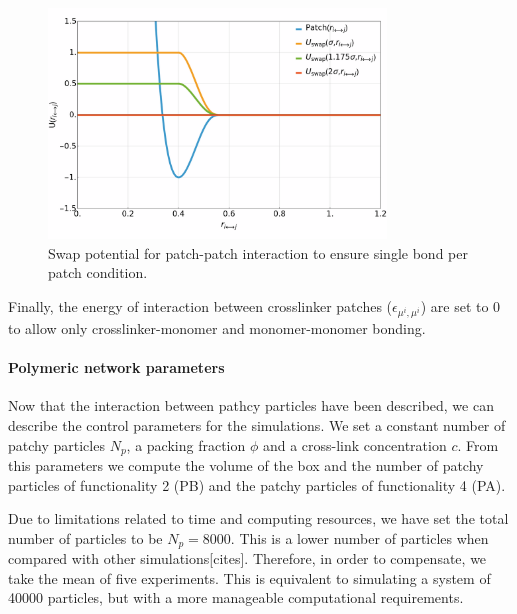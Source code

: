 \begin{figure}[ht!]
    \centering
    \includegraphics[width=0.8\textwidth]{figs/numerical/swapPotential.png}
    \caption{Swap potential for patch-patch interaction to ensure single bond per patch condition.}\label{fig:swappot}
\end{figure}



Finally, the energy of interaction between crosslinker patches ($\epsilon_{\mu^i,\mu^i}$) are set to $0$ to allow only crosslinker-monomer and monomer-monomer bonding.

\paragraph{Polymeric network parameters}
Now that the interaction between pathcy particles have been described, we can describe the control parameters for the simulations.
We set a constant number of patchy particles $N_p$, a packing fraction $\phi$ and a cross-link concentration $c$. 
From this parameters we compute the volume of the box and the number of patchy particles of functionality 2 (PB) and the patchy particles of functionality 4 (PA).

Due to limitations related to time and computing resources, we have set the total number of particles to be $N_p=\num{8000}$.
This is a lower number of particles when compared with other simulations[cites].
Therefore, in order to compensate, we take the mean of five experiments.
This is equivalent to simulating a system of \num{40000} particles, but with a more manageable computational requirements.

